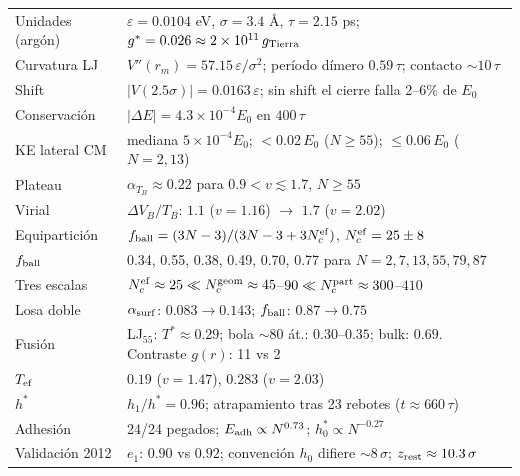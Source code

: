 \documentclass[11pt,a4paper]{article}
\newcommand{\eps}{\varepsilon}
\begin{document}
\begin{center}
\small
\begin{tabular}{ll}
\toprule
Unidades (argón) & $\eps=0.0104$ eV, $\sigma=3.4$ \AA, $\tau=2.15$ ps;
$g^*=0.026 \approx 2\times10^{11}\,g_{\rm Tierra}$\\
Curvatura LJ & $V''(r_m) = 57.15\,\eps/\sigma^2$; período dímero
$0.59\,\tau$; contacto $\sim10\,\tau$\\
Shift & $|V(2.5\sigma)| = 0.0163\,\eps$; sin shift el cierre falla 2--6\%
de $E_0$\\
Conservación & $|\Delta E| = 4.3\times10^{-4}E_0$ en $400\,\tau$\\
KE lateral CM & mediana $5\times10^{-4}E_0$; $<0.02\,E_0$ ($N\ge55$);
$\le0.06\,E_0$ ($N=2,13$)\\
Plateau & $\alpha_{T_B}\approx0.22$ para $0.9<v\lesssim1.7$, $N\ge55$\\
Virial & $\Delta V_B/T_B$: $1.1$ ($v=1.16$) $\to$ $1.7$ ($v=2.02$)\\
Equipartición & $f_{\rm ball}=(3N-3)/(3N-3+3N_c^{\rm ef})$,
$N_c^{\rm ef}=25\pm8$\\
$f_{\rm ball}$ & 0.34, 0.55, 0.38, 0.49, 0.70, 0.77 para
$N=2,7,13,55,79,87$\\
Tres escalas & $N_c^{\rm ef}\approx25 \ll N_c^{\rm geom}\approx45$--$90
\ll N_c^{\rm part}\approx300$--$410$\\
Losa doble & $\alpha_{\rm surf}$: $0.083\to0.143$; $f_{\rm ball}$:
$0.87\to0.75$\\
Fusión & LJ$_{55}$: $T^*\approx0.29$; bola $\sim$80 át.: $0.30$--$0.35$;
bulk: $0.69$. Contraste $g(r)$: 11 vs 2\\
$T_{\rm ef}$ & $0.19$ ($v=1.47$), $0.283$ ($v=2.03$)\\
$h^*$ & $h_1/h^*=0.96$; atrapamiento tras 23 rebotes ($t\approx660\,\tau$)\\
Adhesión & 24/24 pegados; $E_{\rm adh}\propto N^{0.73}$;
$h_0^*\propto N^{-0.27}$\\
Validación 2012 & $e_1$: $0.90$ vs $0.92$; convención $h_0$ difiere
$\sim8\,\sigma$; $z_{\rm rest}\approx10.3\,\sigma$\\
\bottomrule
\end{tabular}
\end{center}
\end{document}
